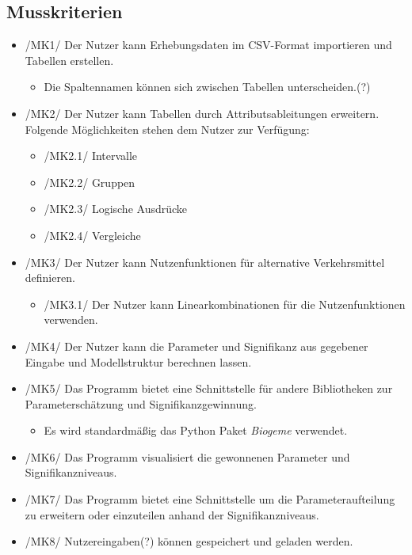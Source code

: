 \documentclass{article}
\begin{document}
\subsection{Musskriterien}
\begin{itemize}
    \item /MK1/ Der Nutzer kann Erhebungsdaten im CSV-Format importieren und Tabellen erstellen.
    \begin{itemize}
        \item Die Spaltennamen können sich zwischen Tabellen unterscheiden.(?)
    \end{itemize}
    \item /MK2/ Der Nutzer kann Tabellen durch Attributsableitungen erweitern.
    \subitem Folgende Möglichkeiten stehen dem Nutzer zur Verfügung:
        \begin{itemize}
            \item /MK2.1/ Intervalle
            \item /MK2.2/ Gruppen
            \item /MK2.3/ Logische Ausdrücke
            \item /MK2.4/ Vergleiche
        \end{itemize}
    \item /MK3/ Der Nutzer kann Nutzenfunktionen für alternative Verkehrsmittel definieren.
    \begin{itemize}
        \item /MK3.1/ Der Nutzer kann Linearkombinationen für die Nutzenfunktionen verwenden.
    \end{itemize}
    \item /MK4/ Der Nutzer kann die Parameter und Signifikanz aus gegebener Eingabe und Modellstruktur berechnen lassen.
    \item /MK5/ Das Programm bietet eine Schnittstelle für andere Bibliotheken zur Parameterschätzung und Signifikanzgewinnung. 
    \begin{itemize}
        \item Es wird standardmäßig das Python Paket \textit{Biogeme} verwendet.
    \end{itemize}
    \item /MK6/ Das Programm visualisiert die gewonnenen Parameter und Signifikanzniveaus.
    \item /MK7/ Das Programm bietet eine Schnittstelle um die Parameteraufteilung zu erweitern oder einzuteilen anhand der Signifikanzniveaus.
    \item /MK8/ Nutzereingaben(?) können gespeichert und geladen werden.
\end{itemize}
\end{document}
